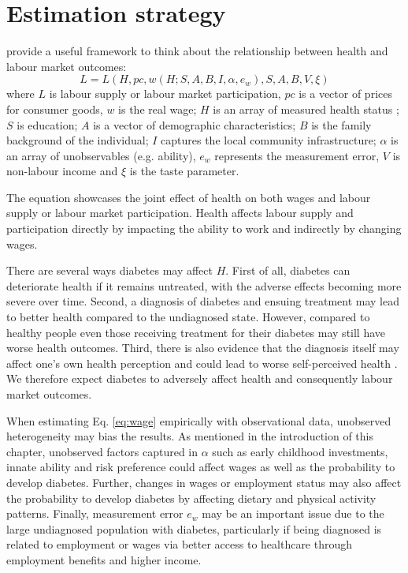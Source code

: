 \section{\label{sec:Estimation Strategy}Estimation strategy}
 
\textcite{Strauss1998} provide a useful framework to think about the relationship between health and labour market outcomes:
\begin{equation}
L=L(H, pc, w(H;S,A,B,I,\alpha,e_{w}), S, A, B, V, \xi) \label{eq:wage}
\end{equation}
where $L$ is labour supply or labour market participation, $pc $ is a vector of prices for consumer goods, $w$ is the real wage; $H$ is an array of measured health status ; $S$ is education; $A$ is a vector of demographic characteristics; $B$ is the family background of the individual; $I$ captures the local community infrastructure; $\alpha$ is an array of unobservables (e.g. ability), $e_w$ represents the measurement error, $V$ is non-labour income and $\xi$ is the taste parameter. 

The equation showcases the joint effect of health on both wages and labour supply or labour market participation. Health affects labour supply and participation directly by impacting the ability to work and indirectly by changing wages.

There are several ways diabetes may affect $H$. First of all, diabetes can deteriorate health if it remains untreated, with the adverse effects becoming more severe over time. Second, a diagnosis of diabetes and ensuing treatment may lead to better health compared to the undiagnosed state. However, compared to healthy people even those receiving treatment for their diabetes may still have worse health outcomes. Third, there is also evidence that the diagnosis itself may affect one's own health perception and could lead to worse self-perceived health \parencite{Thoolen2006}. We therefore expect diabetes to adversely affect health and consequently labour market outcomes.

When estimating Eq. \ref{eq:wage} empirically with observational data, unobserved heterogeneity may bias the results. As mentioned in the introduction of this chapter, unobserved factors captured in $\alpha$ such as early childhood investments, innate ability and risk preference could affect wages as well as the probability to develop diabetes. Further, changes in wages or employment status may also affect the probability to develop diabetes by affecting dietary and physical activity patterns. Finally, measurement error $e_w$ may be an important issue due to the large undiagnosed population with diabetes, particularly if being diagnosed is related to employment or wages via better access to healthcare through employment benefits and higher income.

